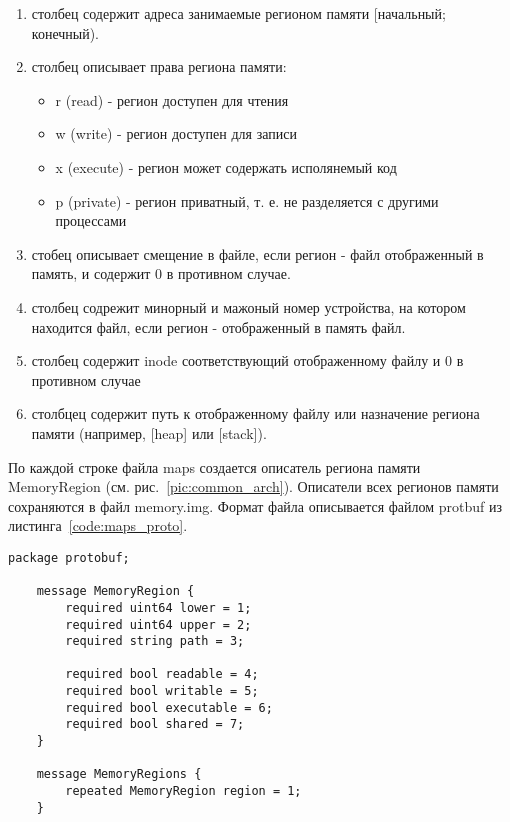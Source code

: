 \begin{enumerate}

    \item столбец содержит адреса занимаемые регионом памяти [начальный; конечный).

    \item столбец описывает права региона памяти:

        \begin{itemize}

            \item r (read) - регион доступен для чтения
            \item w (write) - регион доступен для записи
            \item x (execute) - регион может содержать исполянемый код
            \item p (private) - регион приватный, т. е. не разделяется с другими процессами

        \end{itemize}

    \item стобец описывает смещение в файле, если регион - файл отображенный в память, и содержит 0 в противном случае.

    \item столбец содрежит минорный и мажоный номер устройства, на котором находится файл, если регион - отображенный в память файл.

    \item столбец содержит inode соответствующий отображенному файлу и 0 в противном случае

    \item столбцец содержит путь к отображенному файлу или назначение региона памяти (например, [heap] или [stack]).

\end{enumerate}

По каждой строке файла maps создается описатель региона памяти MemoryRegion (см. рис.~\ref{pic:common_arch}). Описатели всех регионов памяти сохраняются в файл memory.img. Формат файла описывается файлом protbuf из листинга~\ref{code:maps_proto}.

\begin{lstlisting}[caption=Формат сохранения описателей регионов памяти, label=code:maps_proto]
    package protobuf;

    message MemoryRegion {
        required uint64 lower = 1;
        required uint64 upper = 2;
        required string path = 3;

        required bool readable = 4;
        required bool writable = 5;
        required bool executable = 6;
        required bool shared = 7;
    }

    message MemoryRegions {
        repeated MemoryRegion region = 1;
    }
\end{lstlisting}


